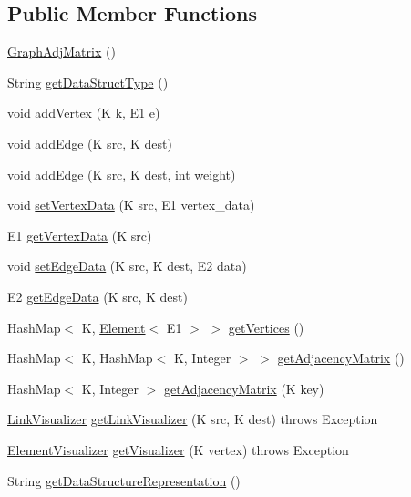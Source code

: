\subsection*{Public Member Functions}
\begin{DoxyCompactItemize}
\item 
\mbox{\hyperlink{classbridges_1_1base_1_1_graph_adj_matrix_a8af4a2575890c3e68da7b39d800267bb}{Graph\+Adj\+Matrix}} ()
\item 
String \mbox{\hyperlink{classbridges_1_1base_1_1_graph_adj_matrix_a16ee088c4c53a9a5cdf3fbbad25cd1af}{get\+Data\+Struct\+Type}} ()
\item 
void \mbox{\hyperlink{classbridges_1_1base_1_1_graph_adj_matrix_a27b5ddb10a6615693460955b6bb3ee0c}{add\+Vertex}} (K k, E1 e)
\item 
void \mbox{\hyperlink{classbridges_1_1base_1_1_graph_adj_matrix_a477fbb5abbed6988e67b4b46b571e87c}{add\+Edge}} (K src, K dest)
\item 
void \mbox{\hyperlink{classbridges_1_1base_1_1_graph_adj_matrix_ad9b05b61e9592fa94045d7b59971b206}{add\+Edge}} (K src, K dest, int weight)
\item 
void \mbox{\hyperlink{classbridges_1_1base_1_1_graph_adj_matrix_a22eee632463a665e7016cf50916dfd83}{set\+Vertex\+Data}} (K src, E1 vertex\+\_\+data)
\item 
E1 \mbox{\hyperlink{classbridges_1_1base_1_1_graph_adj_matrix_a36308a365d1c0f137ffb9a8e76a630f1}{get\+Vertex\+Data}} (K src)
\item 
void \mbox{\hyperlink{classbridges_1_1base_1_1_graph_adj_matrix_a72fe8bd594e3da28ba6e412de88576da}{set\+Edge\+Data}} (K src, K dest, E2 data)
\item 
E2 \mbox{\hyperlink{classbridges_1_1base_1_1_graph_adj_matrix_a3a3795c994ef9033ddb0b1d97029350b}{get\+Edge\+Data}} (K src, K dest)
\item 
Hash\+Map$<$ K, \mbox{\hyperlink{classbridges_1_1base_1_1_element}{Element}}$<$ E1 $>$ $>$ \mbox{\hyperlink{classbridges_1_1base_1_1_graph_adj_matrix_a6a000a302a1082bc2c55fbe8f511fce4}{get\+Vertices}} ()
\item 
Hash\+Map$<$ K, Hash\+Map$<$ K, Integer $>$ $>$ \mbox{\hyperlink{classbridges_1_1base_1_1_graph_adj_matrix_abe7f26cb9874744bc044df18b5d0eb84}{get\+Adjacency\+Matrix}} ()
\item 
Hash\+Map$<$ K, Integer $>$ \mbox{\hyperlink{classbridges_1_1base_1_1_graph_adj_matrix_a43f830cfe126f2be351f6d8c2fccc569}{get\+Adjacency\+Matrix}} (K key)
\item 
\mbox{\hyperlink{classbridges_1_1base_1_1_link_visualizer}{Link\+Visualizer}} \mbox{\hyperlink{classbridges_1_1base_1_1_graph_adj_matrix_a434454a6c8a1fac612392dcf1951dc9d}{get\+Link\+Visualizer}} (K src, K dest)  throws Exception 
\item 
\mbox{\hyperlink{classbridges_1_1base_1_1_element_visualizer}{Element\+Visualizer}} \mbox{\hyperlink{classbridges_1_1base_1_1_graph_adj_matrix_a4358ebee834c69796479a4ee6dfd96b3}{get\+Visualizer}} (K vertex)  throws Exception 
\item 
String \mbox{\hyperlink{classbridges_1_1base_1_1_graph_adj_matrix_ab0786f047bd0c8c47f19d632a1f03eaa}{get\+Data\+Structure\+Representation}} ()
\end{DoxyCompactItemize}
